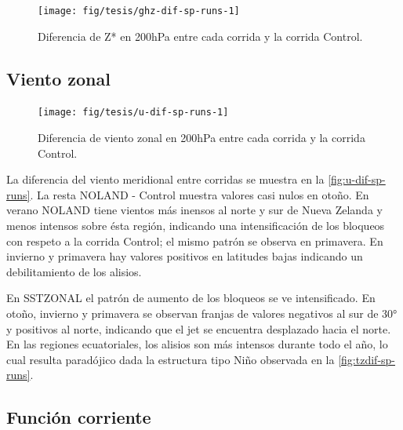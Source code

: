 \documentclass[spanish,a4paper,12pt,oneside]{book}
\begin{document}
\begin{landscape}\begin{figure}

{\centering \texttt{[image: fig/tesis/ghz-dif-sp-runs-1]} 

}

\caption{Diferencia de Z* en 200hPa entre cada corrida y la corrida Control.}\label{fig:ghz-dif-sp-runs}
\end{figure}
\end{landscape}

\subsection{Viento zonal}\label{viento-zonal-2}

\begin{landscape}\begin{figure}

{\centering \texttt{[image: fig/tesis/u-dif-sp-runs-1]} 

}

\caption{Diferencia de viento zonal en 200hPa entre cada corrida y la corrida Control.}\label{fig:u-dif-sp-runs}
\end{figure}
\end{landscape}

La diferencia del viento meridional entre corridas se muestra en la
\autoref{fig:u-dif-sp-runs}. La resta NOLAND - Control muestra valores
casi nulos en otoño. En verano NOLAND tiene vientos más inensos al norte
y sur de Nueva Zelanda y menos intensos sobre ésta región, indicando una
intensificación de los bloqueos con respeto a la corrida Control; el
mismo patrón se observa en primavera. En invierno y primavera hay
valores positivos en latitudes bajas indicando un debilitamiento de los
alisios.

En SSTZONAL el patrón de aumento de los bloqueos se ve intensificado. En
otoño, invierno y primavera se observan franjas de valores negativos al
sur de 30° y positivos al norte, indicando que el jet se encuentra
desplazado hacia el norte. En las regiones ecuatoriales, los alisios son
más intensos durante todo el año, lo cual resulta paradójico dada la
estructura tipo Niño observada en la \autoref{fig:tzdif-sp-runs}.

\subsection{Función corriente}\label{funcion-corriente-3}
\end{document}

